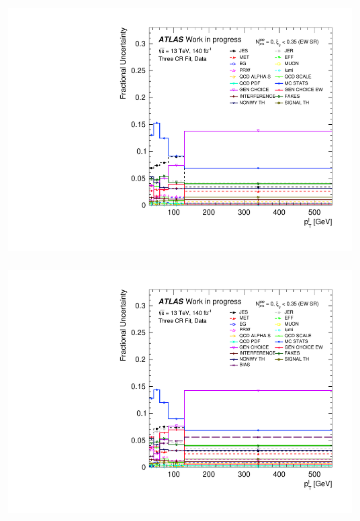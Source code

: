 \begin{figure}[t]
\begin{subfigure}[b]{0.48\textwidth}
    \centering
    \includegraphics[width=\textwidth]{plots/diffx/final/data/3cr/Systematic_Uncertainties_data_lep_pt_3cr_QCD_Sh2211_0p01sigma.pdf}
    \caption{}
\end{subfigure}
\hfill
\begin{subfigure}[b]{0.48\textwidth}
    \centering
    \includegraphics[width=\textwidth]{plots/diffx/final/unfolded/3cr/Systematic_Uncertainties_data_unfolded_lep_pt_3cr_QCD_Sh2211_0p01sigma.pdf}
    \caption{}
\end{subfigure}
\begin{subfigure}[b]{0.48\textwidth}
    \centering

\end{subfigure}
\end{figure}
